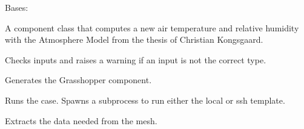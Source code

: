 \documentclass[letterpaper,10pt,english]{sphinxmanual}
\begin{document}
\begin{fulllineitems}
\label{\detokenize{comfort:livestock.components.air.NewAirConditions}}
Bases: {\hyperref[\detokenize{superclass:livestock.components.component.GHComponent}]{}}

A component class that computes a new air temperature and relative humidity with the
Atmosphere Model from the thesis of Christian Kongsgaard.

\begin{fulllineitems}
\label{\detokenize{comfort:livestock.components.air.NewAirConditions.check_inputs}}
Checks inputs and raises a warning if an input is not the correct type.

\end{fulllineitems}


\begin{fulllineitems}
\label{\detokenize{comfort:livestock.components.air.NewAirConditions.config}}
Generates the Grasshopper component.

\end{fulllineitems}


\begin{fulllineitems}
\label{\detokenize{comfort:livestock.components.air.NewAirConditions.do_case}}
Runs the case. Spawns a subprocess to run either the local or ssh template.

\end{fulllineitems}


\begin{fulllineitems}
\label{\detokenize{comfort:livestock.components.air.NewAirConditions.get_mesh_data}}
Extracts the data needed from the mesh.


\end{fulllineitems}
\end{fulllineitems}
\end{document}
